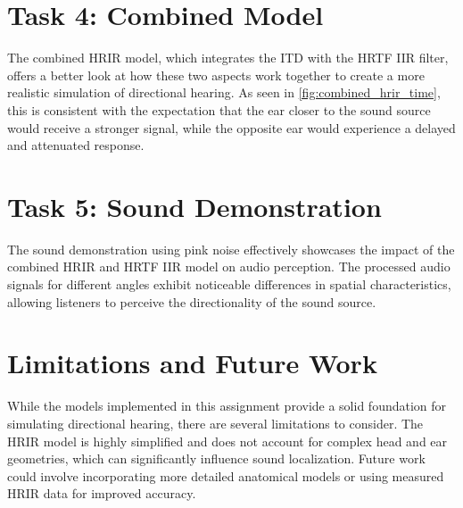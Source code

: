 \section{Task 4: Combined Model}
The combined HRIR model, which integrates the ITD with the HRTF IIR filter, offers a better look at how these two aspects work together to create a more realistic simulation of directional hearing. As seen in \autoref{fig:combined_hrir_time}, this is consistent with the expectation that the ear closer to the sound source would receive a stronger signal, while the opposite ear would experience a delayed and attenuated response.


\section{Task 5: Sound Demonstration}
The sound demonstration using pink noise effectively showcases the impact of the combined HRIR and HRTF IIR model on audio perception. The processed audio signals for different angles exhibit noticeable differences in spatial characteristics, allowing listeners to perceive the directionality of the sound source. 

\section{Limitations and Future Work}
While the models implemented in this assignment provide a solid foundation for simulating directional hearing, there are several limitations to consider. The HRIR model is highly simplified and does not account for complex head and ear geometries, which can significantly influence sound localization. Future work could involve incorporating more detailed anatomical models or using measured HRIR data for improved accuracy.
